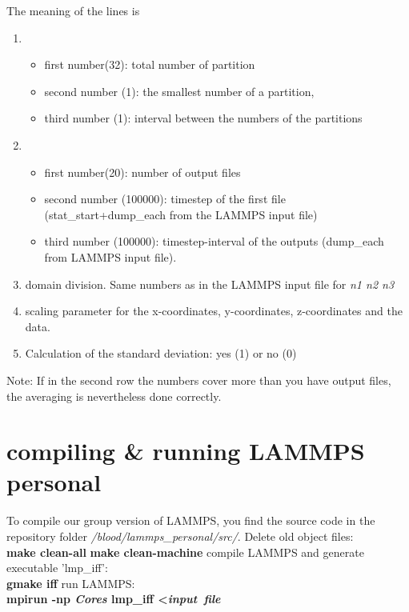 The meaning of the lines is 
\begin{enumerate}
  \item 
  \begin{itemize}
    \item first number(32): total number of partition
    \item second number (1): the smallest number of a partition, 
    \item third number (1): interval between the numbers of the partitions
  \end{itemize} 
\item
\begin{itemize}
    \item first number(20): number of output files
    \item second number (100000): timestep of the first file (stat\_start+dump\_each from the LAMMPS input file)
    \item third number (100000): timestep-interval of the outputs (dump\_each from LAMMPS input file).
  \end{itemize}
\item domain division. Same numbers as in the LAMMPS input file for \textit{n1 n2 n3}
\item scaling parameter for the x-coordinates, y-coordinates, z-coordinates and the data.
\item Calculation of the standard deviation: yes (1) or no (0)
\end{enumerate}
Note: If in the second row the numbers cover more than you have output files, the averaging is nevertheless done correctly.

\section{compiling \& running LAMMPS personal}
To compile our group version of LAMMPS, you find the source code in the repository folder \textit{/blood/lammps\_personal/src/}.
\newline
Delete old object files:\\
\textbf{make clean-all}
\newline
\textbf{make clean-machine}
\newline
compile LAMMPS and generate executable 'lmp\_iff':\\
\textbf{gmake iff}
\newline
run LAMMPS:\\
\textbf{mpirun -np \textit{Cores} lmp\_iff \textless \quad \textit{input\ file}}

